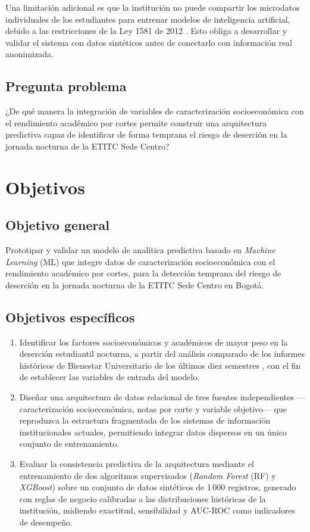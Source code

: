 \documentclass[12pt,letterpaper]{article}
\newcommand{\ML}{\textit{Machine Learning} (ML)\xspace}
\newcommand{\RF}{\textit{Random Forest} (RF)\xspace}
\newcommand{\XGB}{\textit{XGBoost}\xspace}
\begin{document}
Una limitación adicional es que la institución no puede compartir los microdatos individuales de los estudiantes para entrenar modelos de inteligencia artificial, debido a las restricciones de la Ley 1581 de 2012 \parencite{ley1581}. Esto obliga a desarrollar y validar el sistema con datos sintéticos antes de conectarlo con información real anonimizada.

\subsection{Pregunta problema}
¿De qué manera la integración de variables de caracterización socioeconómica con el rendimiento académico por cortes permite construir una arquitectura predictiva capaz de identificar de forma temprana el riesgo de deserción en la jornada nocturna de la ETITC Sede Centro?

\newpage

\section{Objetivos}

\subsection*{Objetivo general}

Prototipar y validar un modelo de analítica predictiva basado en \ML que integre datos de caracterización socioeconómica con el rendimiento académico por cortes, para la detección temprana del riesgo de deserción en la jornada nocturna de la ETITC Sede Centro en Bogotá.

\subsection*{Objetivos específicos}

\begin{enumerate}
  \item Identificar los factores socioeconómicos y académicos de mayor peso en la deserción estudiantil nocturna, a partir del análisis comparado de los informes históricos de Bienestar Universitario de los últimos diez semestres \parencite{etitc_bienestar}, con el fin de establecer las variables de entrada del modelo.
  \item Diseñar una arquitectura de datos relacional de tres fuentes independientes —caracterización socioeconómica, notas por corte y variable objetivo— que reproduzca la estructura fragmentada de los sistemas de información institucionales actuales, permitiendo integrar datos dispersos en un único conjunto de entrenamiento.
  \item Evaluar la consistencia predictiva de la arquitectura mediante el entrenamiento de dos algoritmos supervisados (\RF y \XGB) sobre un conjunto de datos sintéticos de 1\,000 registros, generado con reglas de negocio calibradas a las distribuciones históricas de la institución, midiendo exactitud, sensibilidad y AUC-ROC como indicadores de desempeño.
\end{enumerate}
\end{document}
